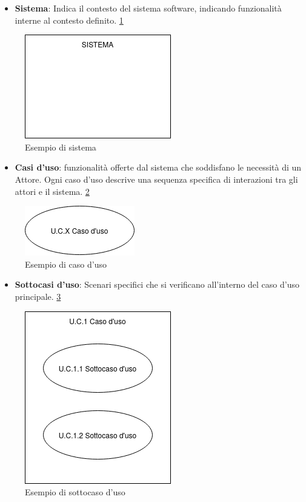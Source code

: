 \begin{itemize}
    \item \textbf{Sistema}: Indica il contesto del sistema software, indicando funzionalità interne al contesto definito. \ref{fig:sistema} 
\end{itemize}

\begin{figure}[H]
    \centering
    \includegraphics{../../../img/sistema.png}
    \caption{Esempio di sistema}
    \label{fig:sistema}
\end{figure}

\begin{itemize}
    \item \textbf{Casi d’uso}: funzionalità offerte dal sistema che soddisfano le necessità di un Attore. Ogni caso d’uso descrive una sequenza specifica di interazioni tra gli attori e il sistema. \ref{fig:caso_uso}
\end{itemize}

\begin{figure}[H]
    \centering
    \includegraphics{../../../img/CasoUso.png}
    \caption{Esempio di caso d'uso}
    \label{fig:caso_uso}
\end{figure}

\begin{itemize}
    \item \textbf{Sottocasi d’uso}: Scenari specifici che si verificano all'interno del caso d’uso principale. \ref{fig:sottocaso_uso}
\end{itemize}

\begin{figure}[H]
    \centering
    \includegraphics{../../../img/Sottocasouso.png}
    \caption{Esempio di sottocaso d'uso}
    \label{fig:sottocaso_uso}
\end{figure}

